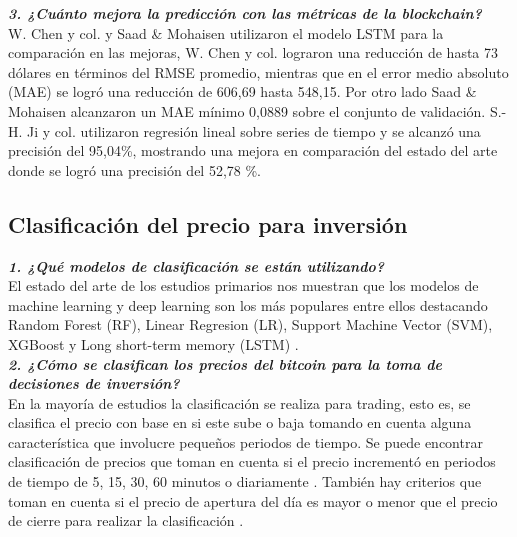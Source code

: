 \textbf{\textit{3. ¿Cuánto mejora la predicción con las métricas de la blockchain?}}\\
W. Chen y col. \parencite*{saadCharacterizingBlockchainbasedCryptocurrencies2018} y Saad \& Mohaisen \parencite*{chenMachineLearningModel2021} utilizaron el modelo LSTM para la comparación en las mejoras, W. Chen y col. \parencite*{chenMachineLearningModel2021} lograron una reducción de hasta 73 dólares en términos del RMSE promedio, mientras que en el error medio absoluto (MAE) se logró una reducción de 606,69 hasta 548,15. Por otro lado Saad \& Mohaisen \parencite*{saadCharacterizingBlockchainbasedCryptocurrencies2018} alcanzaron un MAE mínimo 0,0889 sobre el conjunto de validación.
S.-H. Ji y col. \parencite*{jiBestFeatureSelection2019} utilizaron regresión lineal sobre series de tiempo y se alcanzó una precisión del 95,04\%, mostrando una mejora en comparación del estado del arte \parencite{mcnallyPredictingPriceBitcoin2018} donde se logró una precisión del 52,78 \%.

\subsection{Clasificación del precio para inversión}

\textbf{\textit{1. ¿Qué modelos de clasificación se están utilizando?}}\\
El estado del arte de los estudios primarios nos muestran que los modelos de machine learning y deep learning son los más populares entre ellos destacando Random Forest (RF), Linear Regresion (LR), Support Machine Vector (SVM), XGBoost y Long short-term memory (LSTM) \parencite{ibrahimPredictingMarketMovement2021, jaquartShorttermBitcoinMarket2021,chenBitcoinPricePrediction2020,akyildirimPredictionCryptocurrencyReturns2021,pintelasInvestigatingProblemCryptocurrency2020}.\\

\textbf{\textit{2. ¿Cómo se clasifican los precios del bitcoin para la toma de decisiones de inversión?}}\\
En la mayoría de estudios la clasificación se realiza para trading, esto es, se clasifica el precio con base en si este sube o baja tomando en cuenta alguna característica que involucre pequeños periodos de tiempo. Se puede encontrar clasificación de precios que toman en cuenta si el precio incrementó en periodos de tiempo de 5, 15, 30, 60 minutos o diariamente \parencite{ibrahimPredictingMarketMovement2021, jaquartShorttermBitcoinMarket2021,chenBitcoinPricePrediction2020,pintelasInvestigatingProblemCryptocurrency2020}. También hay criterios que toman en cuenta si el precio de apertura del día es mayor o menor que el precio de cierre para realizar la clasificación \parencite{akyildirimPredictionCryptocurrencyReturns2021}.\\

